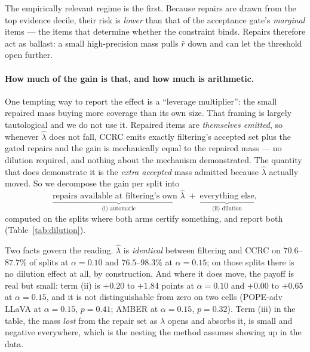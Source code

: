 \documentclass[review,number,doubleblind]{elsarticle}
\theoremstyle{plain}
\theoremstyle{definition}
\theoremstyle{remark}
\begin{document}
The empirically relevant regime is the first. Because repairs are drawn from the top
evidence decile, their risk is \emph{lower} than that of the acceptance gate's
\emph{marginal} items --- the items that determine whether the constraint binds. Repairs
therefore act as ballast: a small high-precision mass pulls $\bar r$ down and can let the
threshold open further.

\paragraph{How much of the gain is that, and how much is arithmetic.}
One tempting way to report the effect is a ``leverage multiplier'': the small repaired mass
buying more coverage than its own size. That framing is largely tautological and we do
not use it. Repaired items are \emph{themselves emitted}, so whenever
$\hat\lambda$ does not fall, CCRC emits exactly filtering's accepted set plus the gated repairs
and the gain is mechanically equal to the repaired mass --- no dilution required, and nothing
about the mechanism demonstrated. The quantity that does demonstrate it is the \emph{extra
accepted} mass admitted because $\hat\lambda$ actually moved. So we decompose the gain per
split into
\[
\underbrace{\text{repairs available at filtering's own }\hat\lambda}_{\text{(i) automatic}}
\;+\;\underbrace{\text{everything else}}_{\text{(ii) dilution}},
\]
computed on the splits where both arms certify something, and report both
(Table~\ref{tab:dilution}).

Two facts govern the reading. $\hat\lambda$ is \emph{identical} between filtering and CCRC on
$70.6$--$87.7\%$ of splits at $\alpha=0.10$ and $76.5$--$98.3\%$ at $\alpha=0.15$; on those
splits there is no dilution effect at all, by construction. And where it does move, the payoff
is real but small: term (ii) is $+0.20$ to $+1.84$ points at $\alpha=0.10$ and $+0.00$ to
$+0.65$ at $\alpha=0.15$, and it is not distinguishable from zero on two cells (POPE-adv LLaVA
at $\alpha=0.15$, $p=0.41$; AMBER at $\alpha=0.15$, $p=0.32$). Term (iii) in the table, the
mass \emph{lost} from the repair set as $\lambda$ opens and absorbs it, is small and negative
everywhere, which is the nesting the method assumes showing up in the data.
\end{document}
